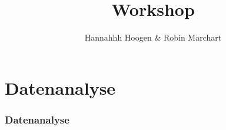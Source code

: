 \documentclass[aspectratio=169]{beamer}
\title{Workshop }
\author{Hannahhh Hoogen \& Robin Marchart}
\institute{TUM Kolleg Wissenschaftstag}
\begin{document}
    \begin{frame}
        
    \end{frame}
    \maketitle
    \section{Datenanalyse}
    \begin{frame}
        \frametitle{Datenanalyse}
        \transfade%
        
    
    \end{frame}
\end{document}
